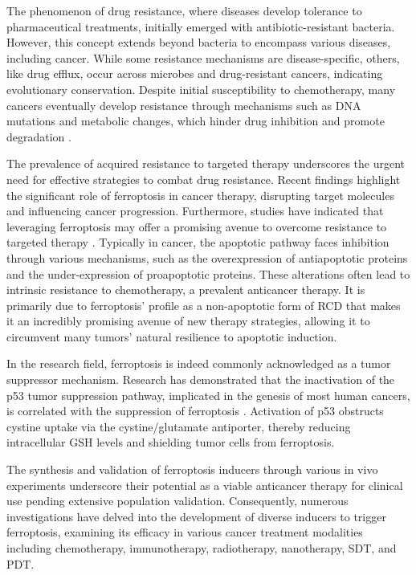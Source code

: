 The phenomenon of drug resistance, where diseases develop tolerance to pharmaceutical treatments, initially emerged with antibiotic-resistant bacteria. However, this concept extends beyond bacteria to encompass various diseases, including cancer. While some resistance mechanisms are disease-specific, others, like drug efflux, occur across microbes and drug-resistant cancers, indicating evolutionary conservation. Despite initial susceptibility to chemotherapy, many cancers eventually develop resistance through mechanisms such as DNA mutations and metabolic changes, which hinder drug inhibition and promote degradation \citep{therapy_resistance2}.

The prevalence of acquired resistance to targeted therapy underscores the urgent need for effective strategies to combat drug resistance. Recent findings highlight the significant role of ferroptosis in cancer therapy, disrupting target molecules and influencing cancer progression. Furthermore, studies have indicated that leveraging ferroptosis may offer a promising avenue to overcome resistance to targeted therapy \citep{ferro_drugs}. Typically in cancer, the apoptotic pathway faces inhibition through various mechanisms, such as the overexpression of antiapoptotic proteins and the under-expression of proapoptotic proteins. These alterations often lead to intrinsic resistance to chemotherapy, a prevalent anticancer therapy. It is primarily due to ferroptosis' profile as a non-apoptotic form of RCD that makes it an incredibly promising avenue of new therapy strategies, allowing it to circumvent many tumors' natural resilience to apoptotic induction.

In the research field, ferroptosis is indeed commonly acknowledged as a tumor suppressor mechanism. Research has demonstrated that the inactivation of the p53 tumor suppression pathway, implicated in the genesis of most human cancers, is correlated with the suppression of ferroptosis \citep{p53}. Activation of p53 obstructs cystine uptake via the cystine/glutamate antiporter, thereby reducing intracellular \ac{GSH} levels and shielding tumor cells from ferroptosis. 

The synthesis and validation of ferroptosis inducers through various in vivo experiments underscore their potential as a viable anticancer therapy for clinical use pending extensive population validation. Consequently, numerous investigations have delved into the development of diverse inducers to trigger ferroptosis, examining its efficacy in various cancer treatment modalities including chemotherapy, immunotherapy, radiotherapy, nanotherapy, SDT, and PDT.

